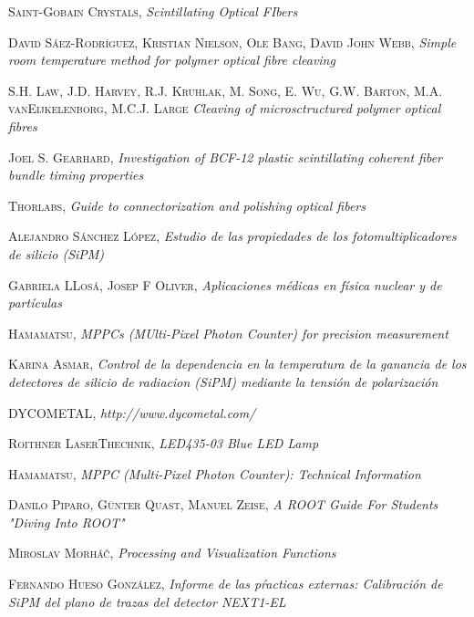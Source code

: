 \begin{thebibliography}{99}
 \textsc{Saint-Gobain Crystals},
\textit{Scintillating Optical FIbers}

 \textsc{David Sáez-Rodríguez}, \textsc{Kristian Nielson}, \textsc{Ole Bang}, \textsc{David John Webb},
\textit{Simple room temperature method for polymer optical fibre cleaving}

 \textsc{S.H. Law}, \textsc{J.D. Harvey}, \textsc{R.J. Kruhlak}, \textsc{M. Song}, \textsc{E. Wu}, \textsc{G.W. Barton}, \textsc{M.A. vanEijkelenborg}, \textsc{M.C.J. Large}
\textit{Cleaving of microsctructured polymer optical fibres}

 \textsc{Joel S. Gearhard},
\textit{Investigation of BCF-12 plastic scintillating coherent fiber bundle timing properties}

 \textsc{Thorlabs},
\textit{Guide to connectorization and polishing optical fibers}

 \textsc{Alejandro Sánchez López},
\textit{Estudio de las propiedades de los fotomultiplicadores de silicio (SiPM)}

 \textsc{Gabriela LLosá}, \textsc{Josep F Oliver},
\textit{Aplicaciones médicas en física nuclear y de partículas}

 \textsc{Hamamatsu},
\textit{MPPCs (MUlti-Pixel Photon Counter) for precision measurement}

 \textsc{Karina Asmar},
\textit{Control de la dependencia en la temperatura de la ganancia de los detectores de silicio de radiacion (SiPM) mediante la tensión de polarización}

 \textsc{DYCOMETAL},
\textit{http://www.dycometal.com/}

 \textsc{Roithner LaserThechnik},
\textit{LED435-03 Blue LED Lamp}

 \textsc{Hamamatsu},
\textit{MPPC (Multi-Pixel Photon Counter): Technical Information}

 \textsc{Danilo Piparo}, \textsc{Günter Quast}, \textsc{Manuel Zeise},
\textit{A ROOT Guide For Students "Diving Into ROOT"}

 \textsc{Miroslav Morháč},
\textit{Processing and Visualization Functions}

 \textsc{Fernando Hueso González},
\textit{Informe de las pŕacticas externas: Calibración de SiPM del plano de trazas del detector NEXT1-EL}


\end{thebibliography}
